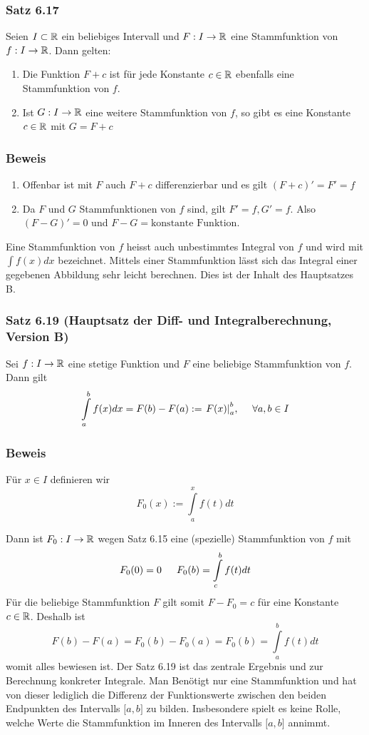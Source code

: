\subsubsection*{Satz 6.17}
Seien $I\subset \mathbb{R}$ ein beliebiges Intervall und $F:I\to\mathbb{R}$ eine Stammfunktion von $f:I\to\mathbb{R}$. Dann gelten:
\begin{enumerate}[\indent (a)]
\item Die Funktion $F+c$ ist für jede Konstante $c\in\mathbb{R}$ ebenfalls eine Stammfunktion von $f$.
\item Ist $G:I\to\mathbb{R}$ eine weitere Stammfunktion von $f$, so gibt es eine Konstante $c\in\mathbb{R}$ mit $G=F+c$
\end{enumerate}

\subsubsection*{Beweis}
\begin{enumerate}[\indent (a)]
\item Offenbar ist mit $F$ auch $F+c$ differenzierbar und es gilt $(F+c)'=F'=f$
\item Da $F$ und $G$ Stammfunktionen von $f$ sind, gilt $F'=f, G'=f$. Also $(F-G)'=0$ und $F-G=\text{konstante Funktion}$.
\end{enumerate}

\begin{definition}{6.18}
 Eine Stammfunktion von $f$ heisst auch unbestimmtes Integral von $f$ und wird mit $\int {f(x)dx}$ bezeichnet. Mittels einer Stammfunktion lässt sich das Integral einer gegebenen Abbildung sehr leicht berechnen. Dies ist der Inhalt des Hauptsatzes B.\\
\end{definition}
\subsubsection*{Satz 6.19 (Hauptsatz der Diff- und Integralberechnung, Version B)}
Sei $f:I\to\mathbb{R}$ eine stetige Funktion und $F$ eine beliebige Stammfunktion von $f$. Dann gilt \[\int\limits_a^b {f(x)dx = F(b) - F(a): = \left. {F(x)} \right|_a^b}\text{,\indent}\forall a,b\in I \]

\subsubsection*{Beweis}
Für $x\in I$ definieren wir \[F_0(x):=\int\limits_a^x {f(t)dt} \]

Dann ist $F_0:I\to\mathbb{R}$ wegen Satz 6.15 eine (spezielle) Stammfunktion von $f$ mit \[{F_0}(0) = 0\text{\indent}{F_0}(b) = \int\limits_c^b {f(t)dt} \]
Für die beliebige Stammfunktion $F$ gilt somit $F-F_0=c$ für eine Konstante $c\in\mathbb{R}$. Deshalb ist \[F(b) - F(a) = {F_0}(b) - {F_0}(a) = {F_0}(b) = \int\limits_a^b {f(t)dt} \] womit alles bewiesen ist. Der Satz 6.19 ist das zentrale Ergebnis und zur Berechnung konkreter Integrale. Man Benötigt nur eine Stammfunktion und hat von dieser lediglich die Differenz der Funktionswerte zwischen den beiden Endpunkten des Intervalls $\lbrack a,b\rbrack$ zu bilden.
Insbesondere spielt es keine Rolle, welche Werte die Stammfunktion im Inneren des Intervalls  $\lbrack a,b\rbrack$ annimmt.
